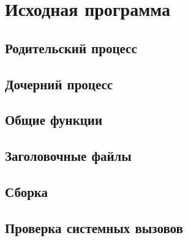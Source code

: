 \section{Исходная программа}

\subsection{Родительский процесс}
\begin{center}

\end{center}

\subsection{Дочерний процесс}
\begin{center}

\end{center}

\subsection{Общие функции}
\begin{center}

\end{center}

\subsection{Заголовочные файлы}





\subsection{Сборка}



\subsection{Проверка системных вызовов}

